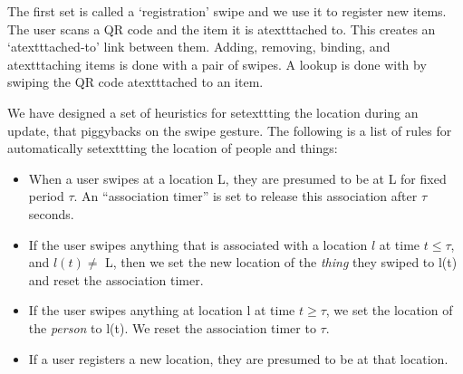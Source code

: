 
The first set is called a `registration' swipe and we use it to register new items.  The user scans a QR code and the item it is atextttached
to.  This creates an `atextttached-to' link between them.  Adding, removing, binding, and atextttaching items is done with a pair of swipes.
A lookup is done with by swiping the QR code atextttached to an item.

We have designed a set of heuristics for setexttting the location during an update, that piggybacks on the swipe gesture.
The following is a list of rules for automatically setexttting the location of people and things:

\begin{itemize}
\item When a user swipes at a location L, they are presumed to be at L for fixed period $\tau$.  An ``association timer'' is set to 
        release this association after $\tau$ seconds.
\item If the user swipes anything that is associated with a location $l$ at time $t \le \tau$, and $l(t)\ne$ L, 
        then we set the new location of the \emph{thing} they swiped to l(t) and reset the association timer.
\item If the user swipes anything at location l at time $t \ge \tau$, we set the location of the \emph{person} to l(t).
        We reset the association timer to $\tau$.
\item If a user registers a new location, they are presumed to be at that location.
\end{itemize}
\vspace{0.08in}



